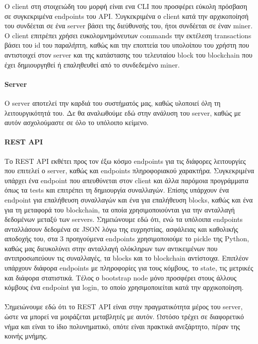 \documentclass[titlepage]{article}
\begin{document}
Ο client στη στοιχειώδη του μορφή είναι ενα CLI που προσφέρει εύκολη πρόσβαση σε συγκεκριμένα endpoints του API. Συγκεκριμένα ο client κατά την αρχικοποίησή του συνδέεται σε ένα server βάσει της διεύθυνσής του, ήτοι συνδέεται σε έναν miner. Ο client επιτρέπει χρήσει ευκολομνημόνευτων commands την εκτέλεση transactions βάσει του id του παραλήπτη, καθώς και την εποπτεία του υπολοίπου του χρήστη που αντιστοιχεί στον server και της κατάστασης του τελευταίου block του blockchain που έχει δημιουργηθεί ή επαληθευθεί από το συνδεδεμένο miner.

\paragraph{Server}

Ο server αποτελεί την καρδιά του συστήματός μας, καθώς υλοποιεί όλη τη λειτουργικότητά του. Δε θα αναλωθούμε εδώ στην ανάλυση του server, καθώς με αυτόν ασχολούμαστε σε όλο το υπόλοιπο κείμενο.

\paragraph{REST API}

Το REST API εκθέτει προς τον έξω κόσμο endpoints για τις διάφορες λειτουργίες που επιτελεί ο server, καθώς και endpoints πληροφοριακού χαρακτήρα. Συγκεκριμένα υπάρχει ένα endpoint που απευθύνεται στον client και άλλα παρόμοια προγράμματα όπως τα tests και επιτρέπει τη δημιουργία συναλλαγών. Επίσης υπάρχουν ένα endpoint για επαλήθευση συναλλαγών και ένα για επαλήθευση blocks, καθώς και ένα για τη μεταφορά του blockchain, τα οποία χρησιμοποιούνται για την ανταλλαγή δεδομένων μεταξύ των servers. Σημειώνουμε εδώ ότι, ενώ τα υπόλοιπα endpoints ανταλλάσουν δεδομένα σε JSON λόγω της ευχρηστίας, ασφάλειας και καθολικής αποδοχής του, στα 3 προηγούμενα endpoints χρησιμοποιούμε το pickle της Python, καθώς μας διευκολύνει στην ανταλλαγή ολόκληρων των αντικειμένων που αντιπροσωπεύουν τις συναλλαγές, τα blocks και το blockchain αντίστοιχα. Επιπλέον υπάρχουν διάφορα endpoints με πληροφορίες για τους κόμβους, το state, τις μετρικές και διάφορα στατιστικά. Τέλος ο bootstrap node μόνο προσφέρει στους άλλους κόμβους ένα endpoint για login, το οποίο χρησιμοποιείται κατά την αρχικοποίηση.

\paragraph{}

Σημειώνουμε εδώ ότι το REST API είναι στην πραγματικότητα μέρος του server, ώστε να μπορεί να μοιράζεται μεταβλητές με αυτόν. Ωστόσο τρέχει σε διαφορετικό νήμα και είναι το ίδιο πολυνηματικό, οπότε είναι πρακτικά ανεξάρτητο, πέραν της κοινής μνήμης.
\end{document}
